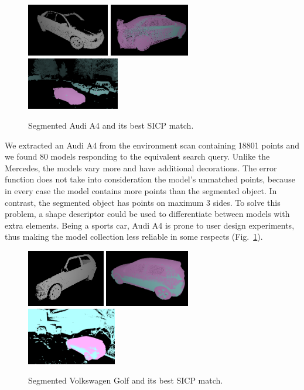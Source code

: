 \documentclass{llncs}
\begin{document}
  \begin{figure}
    \centering
    \includegraphics[height=23mm]{chapter5_pictures/Audi}
    \hfill
    \includegraphics[height=23mm]{chapter5_pictures/Audi_matched}
    \hfill
    \includegraphics[height=23mm]{chapter5_pictures/Audi_matched_scan}
    \caption{Segmented Audi A4 and its best SICP match.}
    \label{audi_trio}
  \end{figure}
	
We extracted an Audi A4 from the environment scan containing 18801
points and we found 80 models responding to the equivalent search
query. Unlike the Mercedes, the models vary more and have additional
decorations. The error function does not take into consideration the
model's unmatched points, because in every case the model contains
more points than the segmented object. In contrast, the segmented
object has points on maximum 3 sides. To solve this problem, a shape
descriptor could be used to differentiate between models with extra
elements. Being a sports car, Audi A4 is prone to user design
experiments, thus making the model collection less reliable in some
respects (Fig.~\ref{audi_trio}).

  \begin{figure}
    \centering
    \includegraphics[height=25mm]{chapter5_pictures/Golf}
    \hfill
    \includegraphics[height=25mm]{chapter5_pictures/Golf_matched}
    \hfill
    \includegraphics[height=25mm]{chapter5_pictures/Golf_matched_scan}
    \caption{Segmented Volkswagen Golf and its best SICP match.}
    \label{golf_trio}
  \end{figure}
\end{document}
